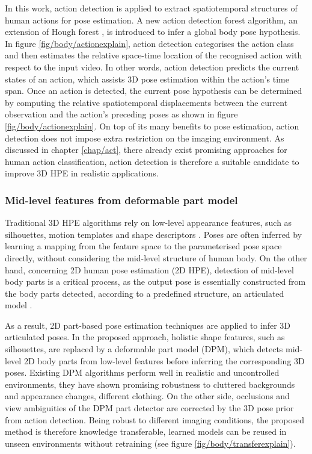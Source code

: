 In this work, action detection is applied to extract spatiotemporal structures of human actions for pose estimation. A new action detection forest algorithm, an extension of Hough forest \cite{Gall2009}, is introduced to infer a global body pose hypothesis.   
In figure \ref{fig/body/actionexplain}, action detection categorises the action class and then estimates the relative space-time location of the recognised action with respect to the input video. In other words, action detection predicts the current states of an action, which assists 3D pose estimation within the action's time span. Once an action is detected, the current pose hypothesis can be determined by computing the relative spatiotemporal displacements between the current observation and the action's preceding poses as shown in figure \ref{fig/body/actionexplain}.   
On top of its many benefits to pose estimation, action detection does not impose extra restriction on the imaging environment. As discussed in chapter \ref{chap/act}, there already exist promising approaches for human action classification, action detection is therefore a suitable candidate to improve 3D HPE in realistic applications.   

\subsubsection{Mid-level features from deformable part model} 

Traditional 3D HPE algorithms rely on low-level appearance features, such as silhouettes, motion templates and shape descriptors \cite{Hogg1983, Rogez2012, Navaratnam2006, Pons-Moll2011, Sigal2012}. Poses are often inferred by learning a mapping from the feature space to the parameterised pose space directly, without considering the mid-level structure of human body.  
On the other hand, concerning 2D human pose estimation (2D HPE), detection of mid-level body parts is a critical process, as the output pose is essentially constructed from the body parts detected, according to a predefined structure, \eg an articulated model \cite{Felzenszwalb2000, Andriluka2009, Yang2011, Eichner2012}.

As a result, 2D part-based pose estimation techniques are applied to infer 3D articulated poses. In the proposed approach, holistic shape features, such as silhouettes, are replaced by a deformable part model (DPM), which detects mid-level 2D body parts from low-level features before inferring the corresponding 3D poses. Existing DPM algorithms perform well in realistic and uncontrolled environments, they have shown promising robustness to cluttered backgrounds and appearance changes, \eg different clothing. On the other side, occlusions and view ambiguities of the DPM part detector are corrected by the 3D pose prior from action detection. Being robust to different imaging conditions, the proposed method is therefore knowledge transferable, learned models can be reused in unseen environments without retraining (see figure \ref{fig/body/transferexplain}). 

